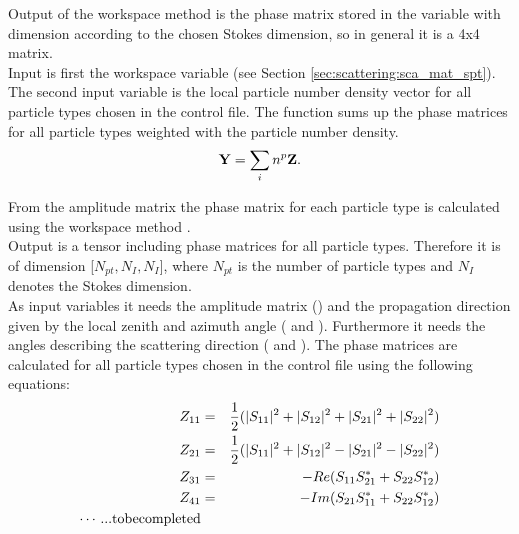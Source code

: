 \label{sec:scattering:tot_sca_mat}

\label{sec:scattering:sca_mat}

Output of the workspace method  is the phase
matrix stored in the variable   with dimension
according to the chosen Stokes
dimension, so in general it is a 4x4 matrix.\\
Input is first the workspace variable  (see Section
\ref{sec:scattering:sca_mat_spt}). The second input variable is the
local particle number density vector  for all particle types
chosen in the control file.
The function sums up the phase matrices for all particle types
weighted with the particle number density.
\begin{eqnarray}
{\bf Y} = \sum_i{n^p{\bf Z}}.
\end{eqnarray}

\label{sec:scattering:sca_mat_spt}

From the amplitude matrix the phase matrix for each
particle type is calculated using the workspace method
.\\
Output is a tensor including phase matrices for all particle
types. Therefore it is  of  dimension
[$N_{pt}, N_{I}, N_{I}$], where $N_{pt}$ is the number of particle
types  and $N_{I}$ denotes the Stokes dimension.\\
As input variables it needs the amplitude matrix ()
and the propagation direction given by the local zenith and azimuth
angle ( and ). Furthermore it needs the
angles describing the scattering direction  ( and
). 
The phase matrices \PhaMat{} are
calculated for all particle types chosen in the control
file using the following equations: 
\begin{eqnarray}
   Z_{11} &=& \frac{1}{2}(|S_{11}|^2+|S_{12}|^2+|S_{21}|^2+|S_{22}|^2)\\
   Z_{21} &=& \frac{1}{2}(|S_{11}|^2+|S_{12}|^2-|S_{21}|^2-|S_{22}|^2)\\
   Z_{31} &=& -Re(S_{11}S_{21}^*+S_{22}S_{12}^*)\\
   Z_{41} &=& -Im(S_{21}S_{11}^*+S_{22}S_{12}^*)\\
\cdots ... {\rm to be completed}
\end{eqnarray}






